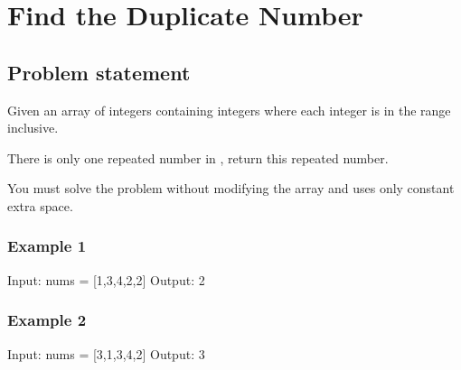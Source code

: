 \documentclass[letterpaper,12pt,english]{book}
\begin{document}
\sphinxstepscope


\section{Find the Duplicate Number}
\label{\detokenize{Sorting/04_SORT_287_Find_the_Duplicate_Number:find-the-duplicate-number}}\label{\detokenize{Sorting/04_SORT_287_Find_the_Duplicate_Number::doc}}

\subsection{Problem statement\sphinxfootnotemark[81]}
\label{\detokenize{Sorting/04_SORT_287_Find_the_Duplicate_Number:problem-statement}}%
\begin{footnotetext}[81]\sphinxAtStartFootnote
{}
%
\end{footnotetext}\ignorespaces 
\sphinxAtStartPar
Given an array of integers  containing  integers where each integer is in the range \sphinxcode{\sphinxupquote{{[}1, n{]}}} inclusive.

\sphinxAtStartPar
There is only one repeated number in , return this repeated number.

\sphinxAtStartPar
You must solve the problem without modifying the array  and uses only constant extra space.


\subsubsection{Example 1}
\label{\detokenize{Sorting/04_SORT_287_Find_the_Duplicate_Number:example-1}}
\begin{sphinxVerbatim}[commandchars=\\\{\}]
Input: nums = [1,3,4,2,2]
Output: 2
\end{sphinxVerbatim}


\subsubsection{Example 2}
\label{\detokenize{Sorting/04_SORT_287_Find_the_Duplicate_Number:example-2}}
\begin{sphinxVerbatim}[commandchars=\\\{\}]
Input: nums = [3,1,3,4,2]
Output: 3
\end{sphinxVerbatim}
\end{document}
